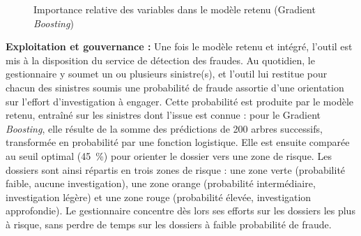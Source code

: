 \begin{figure}[H]
    \centering
    \caption{Importance relative des variables dans le modèle retenu (Gradient \textit{Boosting})}
    \label{fig:importance-gb}
\end{figure}

\noindent\textbf{Exploitation et gouvernance :} Une fois le modèle retenu et intégré, l'outil est mis à la disposition du service de détection des fraudes. Au quotidien, le gestionnaire y soumet un ou plusieurs sinistre(s), et l'outil lui restitue pour chacun des sinistres soumis une probabilité de fraude assortie d'une orientation sur l'effort d'investigation à engager. Cette probabilité est produite par le modèle retenu, entraîné sur les sinistres dont l'issue est connue : pour le Gradient \textit{Boosting}, elle résulte de la somme des prédictions de 200 arbres successifs, transformée en probabilité par une fonction logistique. Elle est ensuite comparée au seuil optimal (45~\%) pour orienter le dossier vers une zone de risque. Les dossiers sont ainsi répartis en trois zones de risque : une zone verte (probabilité faible, aucune investigation), une zone orange (probabilité intermédiaire, investigation légère) et une zone rouge (probabilité élevée, investigation approfondie). Le gestionnaire concentre dès lors ses efforts sur les dossiers les plus à risque, sans perdre de temps sur les dossiers à faible probabilité de fraude.

